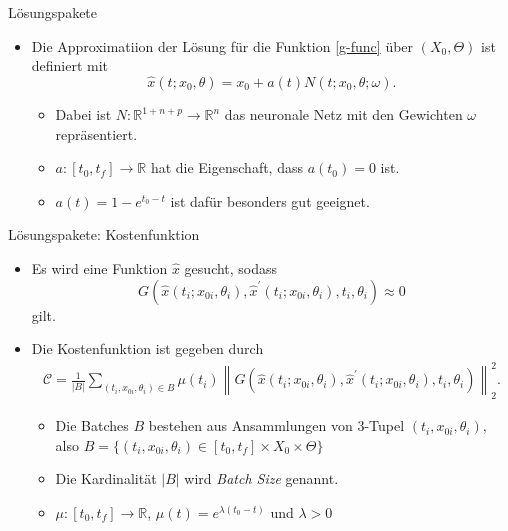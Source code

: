 \begin{frame}{Lösungspakete}
    \begin{itemize}
        \item<1-> Die Approximatiion der Lösung für die Funktion \eqref{g-func} über $(X_0,\Theta)$ ist definiert mit
        \[
            \hat{x}(t;x_0, \theta) = x_0 + a(t) N(t; x_0, \theta; \omega).
        \]
        \begin{itemize}
            \item<1-> Dabei ist $N:\mathbb{R}^{1+n+p} \rightarrow \mathbb{R}^n$ das neuronale Netz mit den Gewichten $\omega$ repräsentiert.
            \item<2-> $a:[t_0,t_f] \rightarrow \mathbb{R}$ hat die Eigenschaft, dass $a(t_0)=0$ ist.
            \item<3-> $a(t) = 1 - e^{t_0-t}$ ist dafür besonders gut geeignet.
        \end{itemize}
    \end{itemize}
\end{frame}

\begin{frame}{Lösungspakete: Kostenfunktion}
    \begin{itemize}
        \item<1-> Es wird eine Funktion $\hat{x}$ gesucht, sodass
        \[
            G(\hat{x}(t_i;x_{0i},\theta_i), \hat{x}^{\prime}(t_i;x_{0i},\theta_i),t_i,\theta_i) \approx 0
        \] gilt.
        \item<2-> Die Kostenfunktion ist gegeben durch
        \begin{align*}
            \mathcal{C} = \frac{1}{|B|} \sum_{(t_i,x_{0i},\theta_i) \in B} \mu(t_i)
            \left\lVert G(\hat{x}(t_i;x_{0i},\theta_i), \hat{x}^{\prime}(t_i;x_{0i},\theta_i),t_i,\theta_i) \right\rVert_2^2.
        \end{align*}
        \begin{itemize}
            \item<1-> Die Batches $B$ bestehen aus Ansammlungen von 3-Tupel $(t_i,x_{0i},\theta_i)$, also
            $B=\{(t_i,x_{0i},\theta_i) \in [t_0,t_f] \times X_0 \times \Theta\}$
            \item<2-> Die Kardinalität $|B|$ wird \textit{Batch Size} genannt.
            \item<3-> $\mu:[t_0,t_f] \rightarrow \mathbb{R}$, $\mu(t) = e^{\lambda (t_0 - t)}$ und $\lambda>0$
        \end{itemize}
    \end{itemize}
\end{frame}

